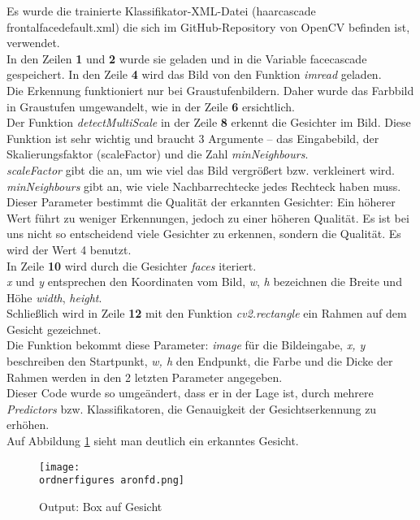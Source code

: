 \begin{flushleft}
	
	Es wurde die trainierte Klassifikator-XML-Datei (haarcascade\textunderscore
	frontalface\textunderscore default.xml) die sich im GitHub-Repository von OpenCV
	befinden ist, verwendet.\\
	In den Zeilen \textbf{1} und \textbf{2} wurde sie geladen und in die Variable
	face\textunderscore cascade gespeichert.
	In den Zeile \textbf{4} wird das Bild von den Funktion \emph{imread} geladen.\\
	Die Erkennung funktioniert nur bei Graustufenbildern. Daher wurde das Farbbild
	in Graustufen umgewandelt, wie in der Zeile \textbf{6} ersichtlich.\\
	Der Funktion \textit{ detectMultiScale } in der Zeile \textbf{8} erkennt die
	Gesichter im Bild. Diese Funktion ist sehr wichtig und braucht 3 Argumente – das
	Eingabebild, der Skalierungsfaktor (scaleFactor) und die Zahl
	\textit{minNeighbours}. 
	\\
	\textit{scaleFactor} gibt die an, um wie viel das Bild vergrößert bzw.
	verkleinert wird. \\
	\textit{minNeighbours} gibt an, wie viele Nachbarrechtecke jedes Rechteck haben
	muss. Dieser Parameter bestimmt die Qualität der erkannten Gesichter: Ein
	höherer Wert führt zu weniger Erkennungen, jedoch zu einer höheren Qualität.
	Es ist bei uns nicht so entscheidend viele Gesichter zu erkennen, sondern die
	Qualität. Es wird der Wert 4 benutzt.
	\\
	In Zeile \textbf{10} wird durch die Gesichter \textit{faces} iteriert. \\
	\textit{x} und \textit{y} entsprechen den Koordinaten vom Bild, \textit{w},
	\textit{h} bezeichnen die Breite und Höhe \textit{width}, \textit{height}.
	\\
	Schließlich wird in Zeile \textbf{12} mit den Funktion \textit{cv2.rectangle}
	ein Rahmen auf dem Gesicht gezeichnet. \\
	Die Funktion bekommt diese Parameter: \textit{image} für die Bildeingabe,
	\textit{x, y} beschreiben den Startpunkt, \textit{w, h} den Endpunkt, die Farbe
	und die Dicke der Rahmen werden in den 2 letzten Parameter angegeben.
	\\
	Dieser Code wurde so umgeändert, dass er in der Lage ist, durch mehrere
	\textit{Predictors} bzw. Klassifikatoren, die Genauigkeit der Gesichtserkennung
	zu erhöhen. \\
	
	Auf Abbildung \ref{fig:aron} sieht man deutlich ein erkanntes Gesicht.
	\begin{figure}[H]
		\centering
		\texttt{[image: \\ordnerfigures aronfd.png]}
		\caption{Output: Box auf Gesicht}
		\label{fig:aron}
	\end{figure}
\end{flushleft}


